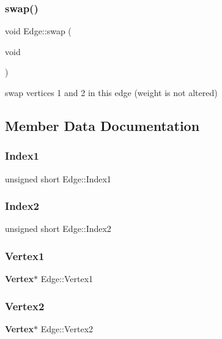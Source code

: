 \mbox{\label{classEdge_add513e10480eb84ae2398033e716e9df}} 
\subsubsection{swap()}
{\footnotesize\ttfamily void Edge\+::swap (\begin{DoxyParamCaption}\item[{void}]{ }\end{DoxyParamCaption})}

swap vertices 1 and 2 in this edge (weight is not altered) 

\subsection{Member Data Documentation}
\mbox{\label{classEdge_ab6f50ba5af2cff33b4be0af543289c70}} 
\subsubsection{Index1}
{\footnotesize\ttfamily unsigned short Edge\+::\+Index1\hspace{0.3cm}{\ttfamily [private]}}

\mbox{\label{classEdge_a7622b443cd056a4bcb4daec77aa418f2}} 
\subsubsection{Index2}
{\footnotesize\ttfamily unsigned short Edge\+::\+Index2\hspace{0.3cm}{\ttfamily [private]}}

\mbox{\label{classEdge_a1aae91fda044302e3a198d04db545477}} 
\subsubsection{Vertex1}
{\footnotesize\ttfamily \textbf{ Vertex}$\ast$ Edge\+::\+Vertex1\hspace{0.3cm}{\ttfamily [private]}}

\mbox{\label{classEdge_a64ab838b08888b8c9305fb9a57f0291d}} 
\subsubsection{Vertex2}
{\footnotesize\ttfamily \textbf{ Vertex}$\ast$ Edge\+::\+Vertex2\hspace{0.3cm}{\ttfamily [private]}}

